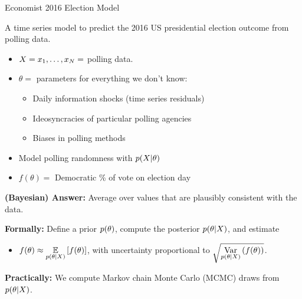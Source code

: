 
\begin{frame}{Economist 2016 Election Model \citep{economist:2020:election}}

\begin{minipage}[t]{0.35\textwidth}
    \ElectionData{}
\end{minipage}
\begin{minipage}{0.04\textwidth}
\hfill
\end{minipage}
\begin{minipage}[t]{0.59\textwidth}

A time series model to predict the 2016 US presidential election
outcome from polling data.

\spskip
\begin{itemize}
\item $X = x_1, \ldots, x_N =$ polling data.
\item $\theta = $ parameters for everything we don't know:
%
\begin{itemize}
\item Daily information shocks (time series residuals)
\item Ideosyncracies of particular polling agencies
\item Biases in polling methods
\end{itemize}
%
\item Model polling randomness with $p(X | \theta)$
\item $f(\theta) = $ Democratic \% of vote on election day
\end{itemize}
%
\end{minipage}

\pause

\pause
\textbf{(Bayesian) Answer: }
    Average over values that are plausibly consistent with the data.

\pause
\textbf{Formally:} Define a prior $p(\theta)$, 
compute the posterior $p(\theta \vert X)$, and estimate
%
\begin{itemize}
\item[] $f(\theta) \approx \underset{p(\theta \vert X)}{\mathbb{E}}\left[f(\theta)\right]$, with 
uncertainty proportional to $\sqrt{\underset{p(\theta \vert X)}{\mathrm{Var}}\left(f(\theta)\right)}$.
\end{itemize}
\pause
\textbf{Practically:} We compute Markov chain Monte Carlo (MCMC) draws from
$p(\theta \vert X)$.


\end{frame}



